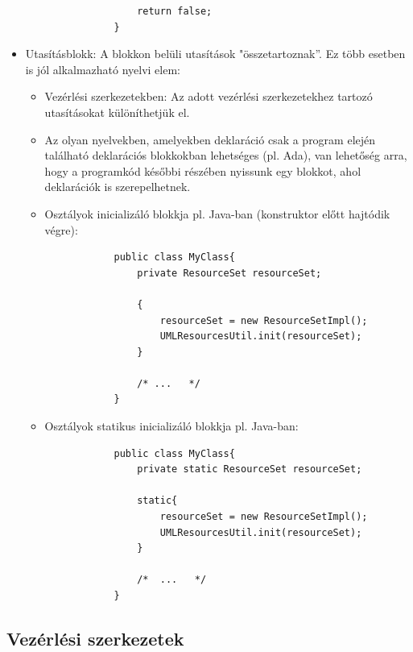 \documentclass[12pt,margin=0px]{article}
\begin{document}
\begin{itemize}
\begin{itemize}
{\begin{verbatim}
			    return false;
			}
			\end{verbatim}
}
		\end{itemize}
		
		\item	Utasításblokk: A blokkon belüli utasítások "összetartoznak”.
		Ez több esetben is jól alkalmazható nyelvi elem:
		\begin{itemize}
			\item	Vezérlési szerkezetekben: Az adott vezérlési szerkezetekhez tartozó utasításokat különíthetjük el.

			\item	Az olyan nyelvekben, amelyekben deklaráció csak a program elején található deklarációs
			blokkokban lehetséges (pl. Ada), van lehetőség arra, hogy a programkód későbbi részében nyissunk
			egy blokkot, ahol deklarációk is szerepelhetnek.
			
			\item	Osztályok inicializáló blokkja pl. Java-ban (konstruktor előtt hajtódik végre):
{\small
			\begin{verbatim}
			public class MyClass{
			    private ResourceSet resourceSet;
			
			    {
			        resourceSet = new ResourceSetImpl();
			        UMLResourcesUtil.init(resourceSet);
			    }
			
			    /* ...   */
			}
			\end{verbatim}
}
			\item	Osztályok statikus inicializáló blokkja pl. Java-ban:
{\small
			\begin{verbatim}
			public class MyClass{
			    private static ResourceSet resourceSet;
			
			    static{
			        resourceSet = new ResourceSetImpl();
			        UMLResourcesUtil.init(resourceSet);
			    }
			
			    /*  ...   */
			}
			\end{verbatim}
}				
		\end{itemize}
	
	\end{itemize}

	\subsection{Vezérlési szerkezetek}
	
\end{document}
